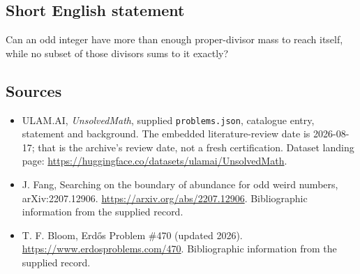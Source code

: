 \documentclass[11pt,a4paper]{article}
\begin{document}
\subsection{Short English statement}

Can an odd integer have more than enough proper-divisor mass to reach itself, while no subset of those divisors sums to it exactly?

\subsection{Sources}

{\small

\begin{itemize}

\item[\hypertarget{source:statement:1}{S1}] ULAM.AI, \emph{UnsolvedMath}, supplied \texttt{problems.json}, catalogue entry, statement and background. The embedded literature-review date is 2026-08-17; that is the archive’s review date, not a fresh certification. Dataset landing page: \url{https://huggingface.co/datasets/ulamai/UnsolvedMath}.

\item[\hypertarget{source:statement:2}{S2}] J. Fang, Searching on the boundary of abundance for odd weird numbers, arXiv:2207.12906. \url{https://arxiv.org/abs/2207.12906}. Bibliographic information from the supplied record.

\item[\hypertarget{source:statement:3}{S3}] T. F. Bloom, Erdős Problem \#470 (updated 2026). \url{https://www.erdosproblems.com/470}. Bibliographic information from the supplied record.

\end{itemize}

}

\label{end:statement}
\end{document}
